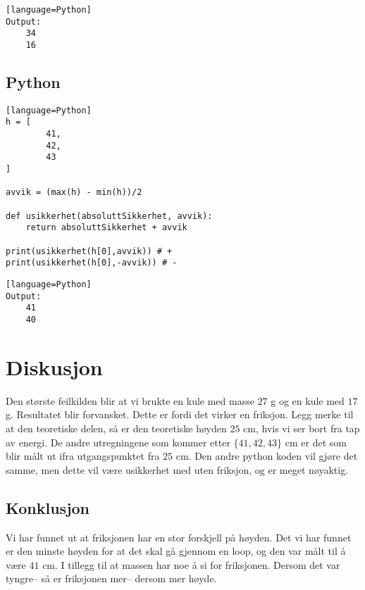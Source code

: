 \documentclass[a4paper]{article}
\begin{document}
\begin{lstlisting}[frame=single][language=Python]
Output:
	34
	16
\end{lstlisting}
\subsection{Python} %
\label{sub:python}
\begin{lstlisting}[frame=single][language=Python]
h = [	
        41,
        42,
        43
]

avvik = (max(h) - min(h))/2 

def usikkerhet(absoluttSikkerhet, avvik):
    return absoluttSikkerhet + avvik

print(usikkerhet(h[0],avvik)) # +
print(usikkerhet(h[0],-avvik)) # -
\end{lstlisting}

\begin{lstlisting}[frame=single][language=Python]
Output:
	41
	40
\end{lstlisting}
\section{Diskusjon} %
Den største feilkilden blir at vi brukte en kule med masse $27$ g og en kule med $17$ g. Resultatet blir forvansket. Dette er fordi det virker en friksjon. Legg merke til at den teoretiske delen, så er den teoretiske høyden $25$ cm, hvis vi ser bort fra tap av energi. De andre utregningene som kommer etter $\{41,42,43\}$ cm er det som blir målt ut ifra utgangspunktet fra $25$ cm. Den andre python koden vil gjøre det samme, men dette vil være usikkerhet med uten friksjon, og er meget nøyaktig.
\label{sec:diskusjon}
\subsection{Konklusjon} %
\label{sub:konklusjon}
\begin{flushleft}
	Vi har funnet ut at friksjonen har en stor forskjell på høyden. Det vi har funnet er den minste høyden for at det skal gå gjennom en loop, og den var målt til å være $41$ cm. I tillegg til at massen har noe å si for friksjonen. Dersom det var tyngre– så er friksjonen mer– dersom mer høyde.
\end{flushleft}
\end{document}

